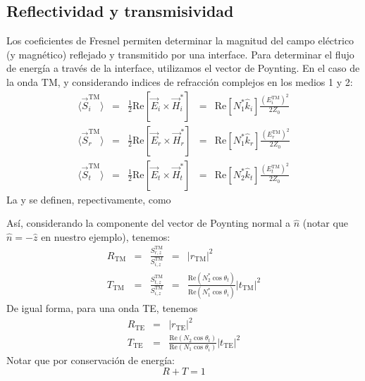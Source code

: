 \documentclass[letterpaper,10pt,english]{jupyterBook}
\begin{document}
\subsection{Reflectividad y transmisividad}
\label{\detokenize{2_ondas_EM_en_la_materia/2_ondas_EM_en_la_materia:reflectividad-y-transmisividad}}
\sphinxAtStartPar
Los coeficientes de Fresnel permiten determinar la magnitud del campo eléctrico (y magnético) reflejado y transmitido por una interface. Para determinar el flujo de energía a través de la interface, utilizamos el vector de Poynting. En el caso de la onda \(\mathrm{TM}\), y considerando indices de refracción complejos en los medios 1 y 2:
\begin{eqnarray*}
\biggl\langle{\vec{S}_i^\mathrm{TM}}\biggl\rangle &=& \frac{1}{2}\mathrm{Re}\left[\vec{E}_i\times\vec{H}_i^*\right] &=& \mathrm{Re}\left[N_1^* \hat{k}_i\right]\frac{{\left(E_i^\mathrm{TM}\right)}^2}{2Z_0}
\\
\biggl\langle{\vec{S}_r^\mathrm{TM}}\biggl\rangle &=& \frac{1}{2}\mathrm{Re}\left[\vec{E}_r\times\vec{H}_r^*\right] &=& \mathrm{Re}\left[N_1^* \hat{k}_r\right]\frac{{\left(E_r^\mathrm{TM}\right)}^2}{2Z_0}
\\
\biggl\langle{\vec{S}_t^\mathrm{TM}}\biggl\rangle &=& \frac{1}{2}\mathrm{Re}\left[\vec{E}_t\times\vec{H}_t^*\right] &=& \mathrm{Re}\left[N_2^* \hat{k}_t\right]\frac{{\left(E_t^\mathrm{TM}\right)}^2}{2Z_0}
\end{eqnarray*}
\sphinxAtStartPar
La  y  se definen, repectivamente, como 

\sphinxAtStartPar
Así, considerando la componente del vector de Poynting normal a \(\hat{n}\) (notar que \(\hat{n} = - \hat{z}\) en nuestro ejemplo), tenemos:
\label{equation:2_ondas_EM_en_la_materia/2_ondas_EM_en_la_materia:c7d7b241-2eae-48e4-bcf8-14b5e25a12e5}\begin{eqnarray}
R_\mathrm{TM} &=& \frac{S_{r,z}^\mathrm{TM}}{S_{i,z}^\mathrm{TM}} &=& \lvert r_\mathrm{TM}\rvert^2
\\[10pt]
T_\mathrm{TM} &=& \frac{S_{t,z}^\mathrm{TM}}{S_{i,z}^\mathrm{TM}} &=& \frac{\mathrm{Re}\left(N_2^*\cos\theta_t\right)}{\mathrm{Re}\left(N_1^*\cos\theta_i\right)}\lvert t_\mathrm{TM}\rvert^2
\end{eqnarray}
\sphinxAtStartPar
De igual forma, para una onda TE, tenemos
\label{equation:2_ondas_EM_en_la_materia/2_ondas_EM_en_la_materia:6a60fc09-bc25-481a-8434-a9afdad84bf1}\begin{eqnarray}
R_\mathrm{TE} &=& \lvert r_\mathrm{TE}\rvert^2
\\[10pt]
T_\mathrm{TE} &=& \frac{\mathrm{Re}\left(N_2\cos\theta_t\right)}{\mathrm{Re}\left(N_1\cos\theta_i\right)}\lvert t_\mathrm{TE}\rvert^2
\end{eqnarray}
\sphinxAtStartPar
Notar que por conservación de energía:
\label{equation:2_ondas_EM_en_la_materia/2_ondas_EM_en_la_materia:b4157c3c-735a-4e84-b977-b4771b05ed92}\begin{equation}
R + T = 1
\end{equation}
\end{document}
